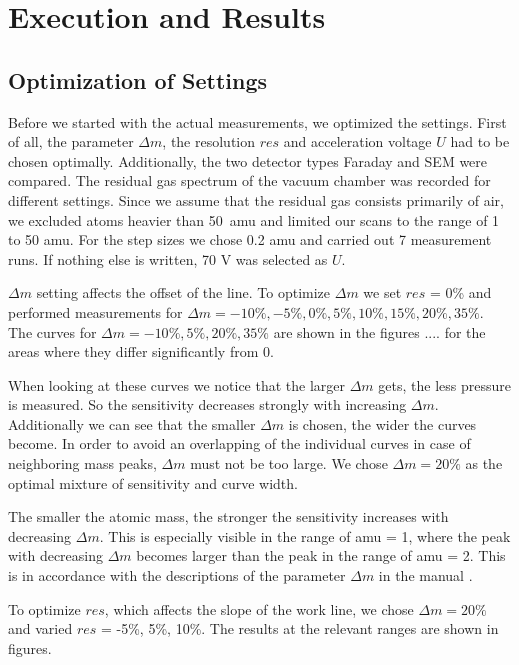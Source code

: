 \newpage
\section{Execution and Results} \label{sec:results}
    \subsection{Optimization of Settings}
    Before we started with the actual measurements, we optimized the settings.
    First of all, the parameter $\Delta m$, the resolution $res$ and acceleration voltage $U$ had to be chosen optimally. Additionally, the two detector types Faraday and SEM were compared. The residual gas spectrum of the vacuum chamber was recorded for different settings. Since we assume that the residual gas consists primarily of air, we excluded atoms heavier than 50~amu and limited our scans to the range of 1 to 50 amu. For the step sizes we chose 0.2 amu and carried out 7 measurement runs. If nothing else is written, 70 V was selected as $U$.
    
    $\Delta m$ setting affects the offset of the line. To optimize $\Delta m$ we set $res$ = 0\% and performed measurements for $\Delta m = -10\%, -5\%, 0\%, 5\%, 10\%, 15\%, 20\%, 35\%$.  The curves for $\Delta m = -10\%, 5\%, 20\%, 35\%$ are shown in the figures .... for the areas where they differ significantly from 0.
    
    When looking at these curves we notice that the larger $\Delta m$ gets, the less pressure is measured. So the sensitivity decreases strongly with increasing $\Delta m$. Additionally we can see
    that the smaller $\Delta m$ is chosen, the wider the curves become. In order to avoid an overlapping of the individual curves in case of neighboring mass peaks, $\Delta m$ must not be too large. We chose $\Delta m= 20\%$ as the optimal mixture of sensitivity and curve width. 
    
    The smaller the atomic mass, the stronger the sensitivity increases with decreasing $\Delta m$. This is especially visible in the range of amu = 1, where the peak with decreasing $\Delta m$ becomes larger than the peak in the range of amu = 2. This is in accordance with the descriptions of the parameter $\Delta m$ in the manual \cite{manual}. 
    
    To optimize $res$, which affects the slope of the work line, we chose $\Delta m = 20\%$ and varied $res$ = -5\%, 5\%, 10\%. The results at the relevant ranges are shown in figures. 
    
